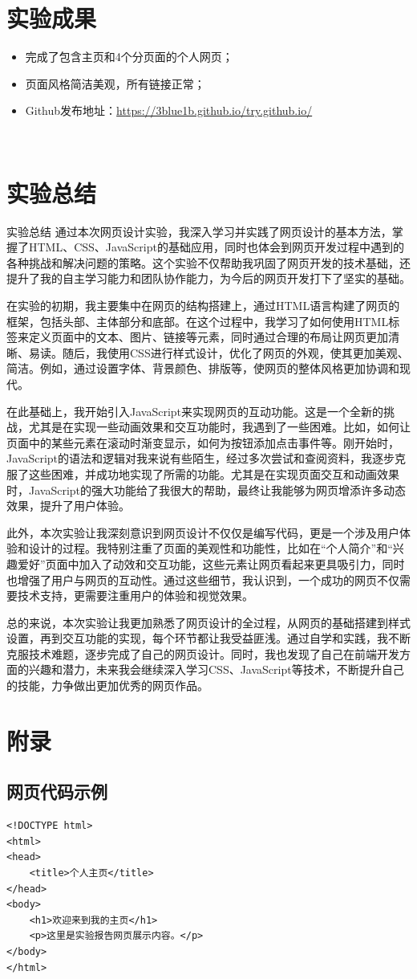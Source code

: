 \documentclass[a4paper,12pt]{article}
\begin{document}
\section{实验成果}
\begin{itemize}
    \item 完成了包含主页和4个分页面的个人网页；
    \item 页面风格简洁美观，所有链接正常；
    \item Github发布地址：\url{https://3blue1b.github.io/try.github.io/}
\end{itemize}
\\[2cm]

\section{实验总结}
实验总结
通过本次网页设计实验，我深入学习并实践了网页设计的基本方法，掌握了HTML、CSS、JavaScript的基础应用，同时也体会到网页开发过程中遇到的各种挑战和解决问题的策略。这个实验不仅帮助我巩固了网页开发的技术基础，还提升了我的自主学习能力和团队协作能力，为今后的网页开发打下了坚实的基础。

在实验的初期，我主要集中在网页的结构搭建上，通过HTML语言构建了网页的框架，包括头部、主体部分和底部。在这个过程中，我学习了如何使用HTML标签来定义页面中的文本、图片、链接等元素，同时通过合理的布局让网页更加清晰、易读。随后，我使用CSS进行样式设计，优化了网页的外观，使其更加美观、简洁。例如，通过设置字体、背景颜色、排版等，使网页的整体风格更加协调和现代。

在此基础上，我开始引入JavaScript来实现网页的互动功能。这是一个全新的挑战，尤其是在实现一些动画效果和交互功能时，我遇到了一些困难。比如，如何让页面中的某些元素在滚动时渐变显示，如何为按钮添加点击事件等。刚开始时，JavaScript的语法和逻辑对我来说有些陌生，经过多次尝试和查阅资料，我逐步克服了这些困难，并成功地实现了所需的功能。尤其是在实现页面交互和动画效果时，JavaScript的强大功能给了我很大的帮助，最终让我能够为网页增添许多动态效果，提升了用户体验。

此外，本次实验让我深刻意识到网页设计不仅仅是编写代码，更是一个涉及用户体验和设计的过程。我特别注重了页面的美观性和功能性，比如在“个人简介”和“兴趣爱好”页面中加入了动效和交互功能，这些元素让网页看起来更具吸引力，同时也增强了用户与网页的互动性。通过这些细节，我认识到，一个成功的网页不仅需要技术支持，更需要注重用户的体验和视觉效果。

总的来说，本次实验让我更加熟悉了网页设计的全过程，从网页的基础搭建到样式设置，再到交互功能的实现，每个环节都让我受益匪浅。通过自学和实践，我不断克服技术难题，逐步完成了自己的网页设计。同时，我也发现了自己在前端开发方面的兴趣和潜力，未来我会继续深入学习CSS、JavaScript等技术，不断提升自己的技能，力争做出更加优秀的网页作品。
\appendix
\section{附录}
\subsection{网页代码示例}
\begin{verbatim}
<!DOCTYPE html>
<html>
<head>
    <title>个人主页</title>
</head>
<body>
    <h1>欢迎来到我的主页</h1>
    <p>这里是实验报告网页展示内容。</p>
</body>
</html>
\end{verbatim}
\end{document}
